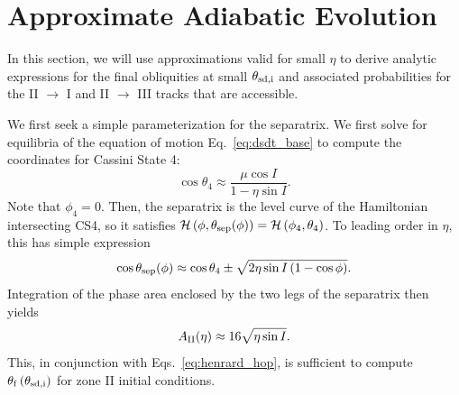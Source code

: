 \documentclass[
        fleqn,
        usenatbib,
    ]{mnras}
\newcommand*{\p}[1]{\left(#1\right)}
\begin{document}
\section{Approximate Adiabatic Evolution}\label{s:ad_approx}

In this section, we will use approximations valid for small $\eta$ to derive
analytic expressions for the final obliquities at small $\theta_{\rm sd, i}$ and
associated probabilities for the II $\to$ I and II $\to$ III tracks that are
accessible.

We first seek a simple parameterization for the separatrix. We first solve for
equilibria of the equation of motion Eq.~\eqref{eq:dsdt_base} to compute the
coordinates for Cassini State 4:
\begin{equation}
    \cos \theta_4 \approx \frac{\mu \cos I}{1 - \eta \sin I}.
\end{equation}
Note that $\phi_4 = 0$. Then, the separatrix is the level curve of the
Hamiltonian intersecting CS4, so it satisfies $\mathcal{H}\p{\phi, \theta_{\rm
sep}(\phi)} = \mathcal{H}\p{\phi_4, \theta_4}$. To leading order in $\eta$, this
has simple expression
\begin{equation}
    \cos \theta_{\rm sep}(\phi) \approx \cos \theta_4 \pm
        \sqrt{2\eta \sin I\p{1 - \cos \phi}}.
\end{equation}
Integration of the phase area enclosed by the two legs of the separatrix then
yields
\begin{equation}
    A_{\rm II}(\eta) \approx 16\sqrt{\eta \sin I}.\label{eq:a_approx}
\end{equation}
This, in conjunction with Eqs.~\eqref{eq:henrard_hop}, is sufficient to compute
$\theta_{\rm f}\p{\theta_{\rm sd, i}}$ for zone II initial conditions.
\end{document}
